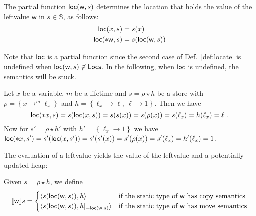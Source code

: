 \begin{definition}[Locate]\label{def:locate}
  The partial function $\loc(\mathsf{w},s)$ determines the location that holds
  the value of the leftvalue $\mathsf{w}$ in $s\in\mathbb{S}$, as follows:
  \begin{align*}
    \loc(x,s) &= s(x)\\
    \loc(*\mathsf{w},s) &= s(\loc(\mathsf{w},s))
  \end{align*}
\end{definition}

\noindent
Note that $\loc$ is a partial function since the second case of
Def.~\ref{def:locate} is undefined when
$\loc(\mathsf{w},s)\not\in\Locs$. In the following, when $\loc$ is undefined, the
semantics will be stuck.

  
\begin{example}
  Let $x$ be a variable, $m$ be a lifetime and
  $s = \rho\star h$ be a store with
  $\rho = \left\{x\rightarrow^m\ell_x\right\}$
  and $h = \left\{\ell_x\rightarrow\ell,\ \ell\rightarrow 1\right\}$.
  Then we have
  \[\loc(\mathtt{*}x,s) = s(\loc(x,s)) = s(s(x)) = s(\rho(x))
  = s(\ell_x) = h(\ell_x) = \ell\;.\]
  Now for $s' = \rho\star h'$ with
  $h' = \left\{\ell_x\rightarrow 1\right\}$ we have
  $\loc(\mathtt{*}x,s') = s'(\loc(x,s')) = s'(s'(x)) = s'(\rho(x))
  = s'(\ell_x) = h'(\ell_x) = 1$.
\end{example}


The evaluation of a leftvalue yields the value of the leftvalue and a potentially updated heap:

\begin{definition}\label{def:semantics_leftvalues}
  Given $s=\rho\star h$, we define
  \[
  \den[\mathsf{w}]{s}=\begin{cases}
  \langle s(\loc(\mathsf{w},s)), h\rangle & \text{if the static type of $\mathsf{w}$ has copy semantics}\\
  \langle s(\loc(\mathsf{w},s)), h|_{-\loc(\mathsf{w},s)}\rangle & \text{if the static type of $\mathsf{w}$ has move semantics}
  \end{cases}
  \]
\end{definition}

